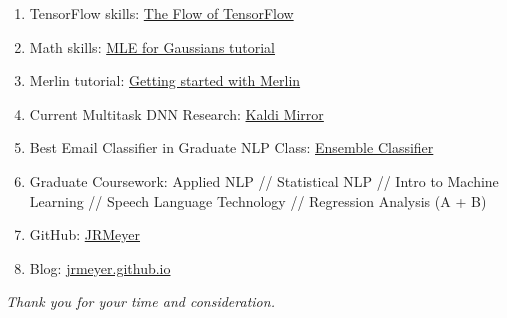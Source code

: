 \documentclass[12pt,a4paper]{article}
\begin{document}
\begin{enumerate}

\item TensorFlow skills: \href{http://jrmeyer.github.io/machinelearning/2016/02/01/TensorFlow-Tutorial.html}{The Flow of TensorFlow}
  
\item Math skills: \href{http://jrmeyer.github.io/machinelearning/2017/08/18/mle.html}{MLE for Gaussians tutorial}

\item Merlin tutorial: \href{http://jrmeyer.github.io/tts/2017/02/14/Installing-Merlin.html}{Getting started with Merlin}

  \item Current Multitask DNN Research: \href{https://github.com/JRMeyer/kaldi-mirror/tree/master/egs/kgz/kyrgyz-model}{Kaldi Mirror}

  
\item Best Email Classifier in Graduate NLP Class: \href{https://github.com/JRMeyer/statistical_nlp/blob/master/spam_classifier.py}{Ensemble Classifier}


\item Graduate Coursework: Applied NLP // Statistical NLP // Intro to Machine Learning // Speech Language Technology // Regression Analysis (A + B)

\item GitHub: \href{https://github.com/JRMeyer}{JRMeyer}

\item Blog: \href{http://jrmeyer.github.io}{jrmeyer.github.io}
\end{enumerate}

    
\begin{center}
\textit{Thank you for your time and consideration.}  
\end{center}
\end{document}
